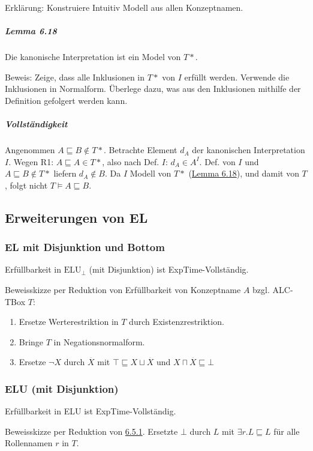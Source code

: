 Erklärung: Konstruiere Intuitiv Modell aus allen Konzeptnamen.

\hypertarget{lemma-6.18}{\subparagraph{Lemma 6.18}\label{lemma-6.18}}

Die kanonische Interpretation ist ein Model von $T*$.

Beweis: Zeige, dass alle Inklusionen in $T*$ von $I$ erfüllt werden.
Verwende die Inklusionen in Normalform. Überlege dazu, was aus den
Inklusionen mithilfe der Definition gefolgert werden kann.

\subparagraph{Vollständigkeit}\label{vollstuxe4ndigkeit-2}

Angenommen $A \sqsubseteq B \notin T*$. Betrachte Element $d_{A}$
der kanonischen Interpretation $I$. Wegen R1:
$A \sqsubseteq A \in T*$, also nach Def. $I$: $d_{A} \in A^{I}$.
Def. von $I$ und $A \sqsubseteq B \notin T*$ liefern
$d_{A} \notin B$. Da $I$ Modell von $T*$
(\protect\hyperlink{lemma-6.18}{Lemma 6.18}), und damit von $T$, folgt
nicht $T \vDash A \sqsubseteq B$.

\subsection{Erweiterungen von EL}\label{erweiterungen-von-el}

\hypertarget{el-mit-disjunktion-und-bottom}{\subsubsection{EL mit
Disjunktion und Bottom}\label{el-mit-disjunktion-und-bottom}}

Erfüllbarkeit in $\text{ELU}_{\bot}$ (mit Disjunktion) ist
ExpTime-Vollständig.

Beweisskizze per Reduktion von Erfüllbarkeit von Konzeptname $A$ bzgl.
ALC-TBox $T$:

\begin{enumerate}
\def\labelenumi{\arabic{enumi}.}
\item
  Ersetze Werterestriktion in $T$ durch Existenzrestriktion.
\item
  Bringe $T$ in Negationsnormalform.
\item
  Ersetze $\neg X$ durch $\overset{\overline{}}{X}$ mit
  $\top \sqsubseteq X \sqcup \overset{\overline{}}{X}$ und
  $X \sqcap \overset{\overline{}}{X} \sqsubseteq \bot$
\end{enumerate}

\subsubsection{ELU (mit Disjunktion)}\label{elu-mit-disjunktion}

Erfüllbarkeit in ELU ist ExpTime-Vollständig.

Beweisskizze per Reduktion von
\protect\hyperlink{el-mit-disjunktion-und-bottom}{6.5.1}. Ersetzte
$\bot$ durch $L$ mit $\exists r.L \sqsubseteq L$ für alle
Rollennamen $r$ in $T$.
